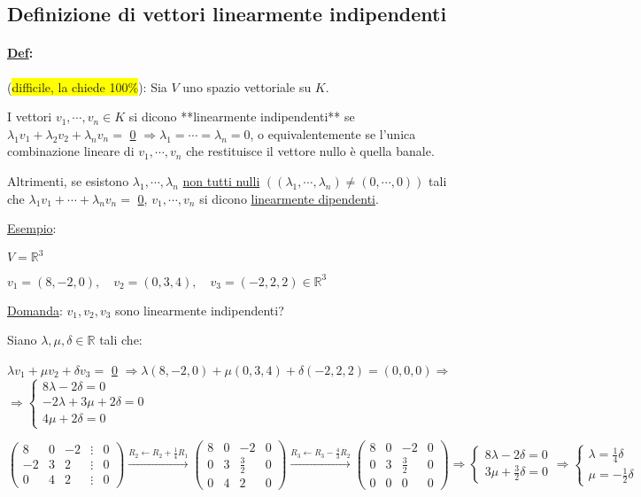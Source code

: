 \documentclass{article}
\newcommand{\hl}[1]{\colorbox{yellow}{#1}}
\newcommand{\ul}[1]{\underline{#1}}
\newcommand{\R}{\mathbb{R}}
\newcommand{\Def}[2]{\paragraph{\ul{Def}:}#1\\\hspace*{3em}\begin{minipage}{.8\textwidth}#2\end{minipage}}
\begin{document}
\subsection{Definizione di vettori linearmente indipendenti}
\Def{(\hl{difficile, la chiede 100\%}): Sia $V$ uno spazio vettoriale su $K$.}{
	I vettori $v_1,\cdots,v_n\in K$ si dicono **linearmente indipendenti** se
	$\lambda_1v_1+\lambda_2v_2+\lambda_nv_n=$ \ul{0} $\Rightarrow\lambda_1=\cdots=\lambda_n=0$, o equivalentemente se l'unica combinazione lineare di $v_1,\cdots,v_n$ che restituisce il vettore nullo è quella banale.

	Altrimenti, se esistono $\lambda_1,\cdots,\lambda_n$ \ul{non tutti nulli} $((\lambda_1,\cdots,\lambda_n)\not=(0,\cdots,0))$ tali che $\lambda_1v_1+\cdots+\lambda_nv_n=$ \ul{0}, $v_1,\cdots,v_n$ si dicono \ul{linearmente dipendenti}.
}
\ul{Esempio}:

$V=\R^3$

$v_1=(8,-2,0),\quad v_2=(0,3,4),\quad v_3=(-2,2,2)\in\R^3$

\ul{Domanda}: $v_1,v_2,v_3$ sono linearmente indipendenti?

Siano $\lambda,\mu,\delta\in\R$ tali che:

$\lambda v_1+\mu v_2+\delta v_3=$ \ul{0} $\Rightarrow\lambda(8,-2,0)+\mu(0,3,4)+\delta(-2,2,2)=(0,0,0)\Rightarrow$
$\Rightarrow
\begin{cases}
	8\lambda-2\delta=0       \\
	-2\lambda+3\mu+2\delta=0 \\
	4\mu+2\delta=0
\end{cases}$

$\begin{pmatrix}
	8  & 0 & -2 & \vdots & 0 \\
	-2 & 3 & 2  & \vdots & 0 \\
	0  & 4 & 2  & \vdots & 0
\end{pmatrix}\xrightarrow{R_2\leftarrow R_2+\frac{1}{4}R_1}
\begin{pmatrix}
	8 & 0 & -2          & 0 \\
	0 & 3 & \frac{3}{2} & 0 \\
	0 & 4 & 2           & 0
\end{pmatrix}\xrightarrow{R_3\leftarrow R_3-\frac{4}{3}R_2}
\begin{pmatrix}
	8 & 0 & -2          & 0 \\
	0 & 3 & \frac{3}{2} & 0 \\
	0 & 0 & 0           & 0
\end{pmatrix}\Rightarrow
\begin{cases}
	8\lambda-2\delta=0 \\
	3\mu+\frac{3}{2}\delta=0
\end{cases}\Rightarrow
\begin{cases}
	\lambda=\frac{1}{4}\delta \\
	\mu=-\frac{1}{2}\delta
\end{cases}$
\end{document}
